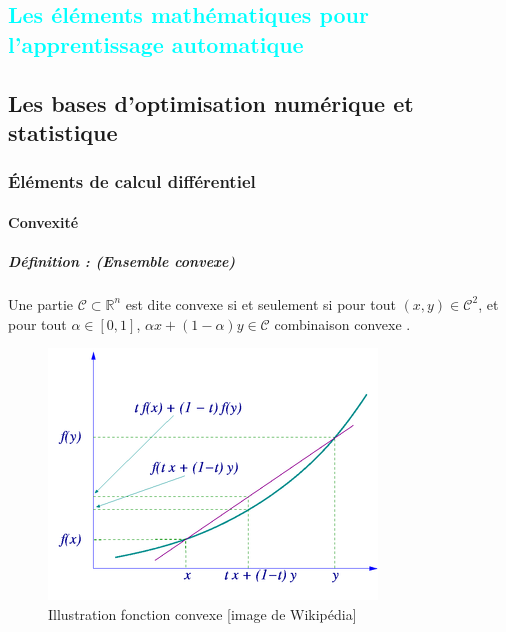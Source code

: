 
%
%

\textcolor{cyan}{\chapter{Les éléments mathématiques pour l'apprentissage automatique}}
\section{Les bases d'optimisation numérique et statistique}
	\subsection{Éléments de calcul différentiel}
	\subsubsection{\textbf{Convexité}}
		\paragraph*{Définition : (Ensemble convexe)} 
		Une partie $\mathcal{C} \subset \mathbb{R}^n $ est dite convexe si et seulement si pour tout $(x,y) \in \mathcal{C}^2$, 
		et pour tout $ \alpha \in [0, 1]$,
		$ \alpha x + (1 - \alpha)y \in \mathcal{C}$ combinaison convexe \cite{jtshiman:2021}.
		
		\begin{figure}[bth]
			\centering
			\includegraphics{images/convex_function_graph.png}
			\caption{Illustration fonction convexe [image de Wikipédia]}
			\label{fig:convexe_graph}
		\end{figure}	
		
